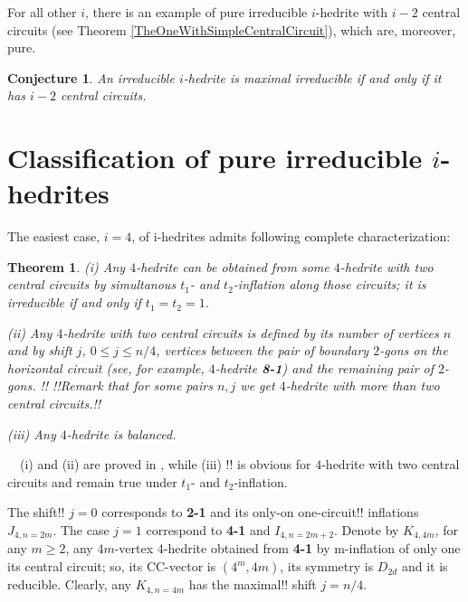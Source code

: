 \documentclass[12pt]{article}
\newtheorem{theorem}{Theorem}
\newtheorem{conjecture}{Conjecture}
\newcommand{\proof}{\noindent{\bf Proof.}\ \ }
\begin{document}
\begin{center}
\epsfxsize=60mm
\end{center}

For all other $i$, there is an example of pure irreducible $i$-hedrite with $i-2$ central circuits (see 
Theorem \ref{TheOneWithSimpleCentralCircuit}), which are, moreover, pure.















\begin{conjecture}
An irreducible $i$-hedrite is maximal irreducible if and only if it has $i-2$ central circuits.
\end{conjecture}



\section{Classification of pure irreducible $i$-hedrites}
The easiest case, $i=4$, of i-hedrites admits following complete
characterization:

\begin{theorem}\label{Theorem-for-4-hedrite}
(i) Any $4$-hedrite can be obtained from some $4$-hedrite with two central
circuits by simultanous $t_1$- and $t_2$-inflation along those circuits; it is
irreducible if and only if $t_1=t_2=1$.

(ii) Any $4$-hedrite with two central circuits is defined by
its number of vertices $n$ and by {\em shift} $j$, $0 \le j \le n/4$,
vertices between the pair of boundary $2$-gons on the horizontal
circuit (see, for example, $4$-hedrite {\bf 8-1}) and the remaining
pair of $2$-gons. 
!!%
!!Remark that for some pairs $n, j$ we get $4$-hedrite with more than two
central circuits.!!

(iii) Any $4$-hedrite is balanced.

\end{theorem}
\proof (i) and (ii) are proved in \cite{DSt}, 
while (iii) !!
is obvious for $4$-hedrite with two central circuits and remain true
under $t_1$- and $t_2$-inflation.

The shift!! $j=0$ corresponds to {\bf 2-1} and its 
only-on one-circuit!! inflations
$J_{4,n=2m}$. The case $j=1$ correspond to {\bf 4-1} and $I_{4,n=2m+2}$.
Denote by $K_{4,4m}$, for any $m \ge 2$, any $4m$-vertex $4$-hedrite obtained
from {\bf 4-1} by m-inflation of only one its central circuit; so, its 
CC-vector is $(4^m,4m)$, its symmetry is $D_{2d}$ and it is reducible.
Clearly, any $K_{4,n=4m}$ has the maximal!! shift $j=n/4$.
\end{document}
